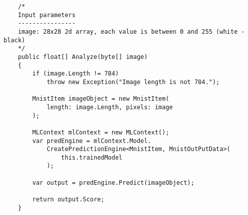 \begin{verbatim}
    /*
    Input parameters
    ----------------
    image: 28x28 2d array, each value is between 0 and 255 (white - black)
    */
    public float[] Analyze(byte[] image)
    {
        if (image.Length != 784)
            throw new Exception("Image length is not 784.");

        MnistItem imageObject = new MnistItem(
            length: image.Length, pixels: image
        );

        MLContext mlContext = new MLContext();
        var predEngine = mlContext.Model.
            CreatePredictionEngine<MnistItem, MnistOutPutData>(
                this.trainedModel
            );

        var output = predEngine.Predict(imageObject);

        return output.Score;
    }
\end{verbatim}